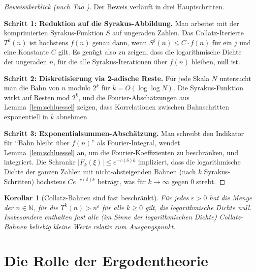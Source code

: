 \documentclass[12pt,a4paper]{article}
\newtheorem{corollary}[theorem]{Korollar}
\begin{document}
\begin{proof}[Beweisüberblick (nach Tao \cite{Tao2022})]
Der Beweis verläuft in drei Hauptschritten.

\textbf{Schritt 1: Reduktion auf die Syrakus-Abbildung.}
Man arbeitet mit der komprimierten Syrakus-Funktion $S$ auf ungeraden Zahlen. Das
Collatz-Iterierte $T^k(n)$ ist höchstens $f(n)$ genau dann, wenn $S^j(n) \leq C \cdot f(n)$
für ein $j$ und eine Konstante $C$ gilt. Es genügt also zu zeigen, dass die logarithmische
Dichte der ungeraden $n$, für die alle Syrakus-Iterationen über $f(n)$ bleiben, null ist.

\textbf{Schritt 2: Diskretisierung via 2-adische Reste.}
Für jede Skala $N$ untersucht man die Bahn von $n$ modulo $2^k$ für $k = O(\log \log N)$.
Die Syrakus-Funktion wirkt auf Resten mod $2^k$, und die Fourier-Abschätzungen aus
Lemma~\ref{lem:schluessel} zeigen, dass Korrelationen zwischen Bahnschritten exponentiell
in $k$ abnehmen.

\textbf{Schritt 3: Exponentialsummen-Abschätzung.}
Man schreibt den Indikator für ``Bahn bleibt über $f(n)$'' als Fourier-Integral, wendet
Lemma~\ref{lem:schluessel} an, um die Fourier-Koeffizienten zu beschränken, und integriert.
Die Schranke $|F_k(\xi)| \leq e^{-c(\delta)k}$ impliziert, dass die logarithmische Dichte
der ganzen Zahlen mit nicht-absteigenden Bahnen (nach $k$ Syrakus-Schritten) höchstens
$C e^{-c(\delta)k}$ beträgt, was für $k \to \infty$ gegen 0 strebt.
\end{proof}

\begin{corollary}[Collatz-Bahnen sind fast beschränkt]\label{cor:fast_beschraenkt}
Für jedes $\varepsilon > 0$ hat die Menge der $n \in \mathbb{N}$, für die $T^k(n) > n^\varepsilon$
für alle $k \geq 0$ gilt, die logarithmische Dichte null. Insbesondere enthalten fast alle
(im Sinne der logarithmischen Dichte) Collatz-Bahnen beliebig kleine Werte relativ zum
Ausgangspunkt.
\end{corollary}

\section{Die Rolle der Ergodentheorie}
\end{document}
